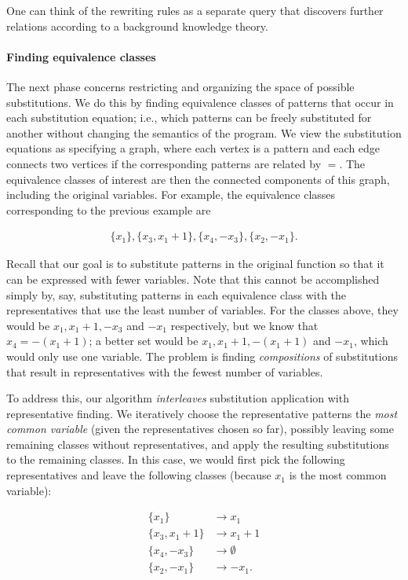 \documentclass{acmsiggraph}
\begin{document}
One can think of the rewriting rules
as a separate query that discovers further relations
according to a background knowledge theory.

\paragraph{Finding equivalence classes} The next phase concerns
restricting and organizing the space of possible substitutions.
We do this by finding equivalence classes of patterns
that occur in each substitution equation;
i.e., which patterns can be freely substituted for another
without changing the semantics of the program.
We view the substitution equations as specifying a graph,
where each vertex is a pattern and each edge
connects two vertices if the corresponding patterns are related by $=$.
The equivalence classes of interest are then the connected components of this graph,
including the original variables.
For example, the equivalence classes corresponding to the previous example are

\begin{align*}
\{x_1\}, \{x_3, x_1 + 1\}, \{x_4, -x_3\}, \{x_2, -x_1\}.
\end{align*}

Recall that our goal is to
substitute patterns in the original function
so that it can be expressed with fewer variables.
Note that this cannot be accomplished simply by,
say, substituting patterns in each equivalence class
with the representatives that use the least number of variables.
For the classes above, they would be
$x_1, x_1 + 1, -x_3$ and $-x_1$ respectively, but
we know that $x_4= -(x_1 + 1)$;
a better set would be $x_1, x_1 + 1, -(x_1 + 1)$ and $-x_1$,
which would only use one variable.
The problem is finding \emph{compositions} of substitutions
that result in representatives with the fewest number of variables.

To address this, our algorithm \emph{interleaves} substitution application with representative finding.
We iteratively choose the representative patterns the \emph{most common variable}
(given the representatives chosen so far),
possibly leaving some remaining classes without representatives,
and apply the resulting substitutions to the remaining classes.
In this case, we would first pick the following representatives and leave the following classes
(because $x_1$ is the most common variable):

\begin{align*}
\{x_1\} &\rightarrow x_1 \\
\{x_3, x_1 + 1\} &\rightarrow x_1 + 1 \\
\{x_4, -x_3\} &\rightarrow \emptyset \\
\{x_2, -x_1\} &\rightarrow -x_1.
\end{align*}
\end{document}
